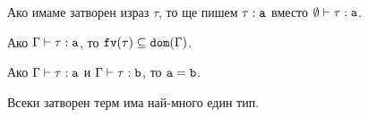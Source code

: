 \begin{prooftree}
\end{prooftree}

\begin{prooftree}
\end{prooftree}

Ако имаме затворен израз $\tau$, то ще пишем $\tau : \vv{a}$ вместо $\emptyset \vdash \tau : \vv{a}$.

\begin{proposition}
  Ако $\Gamma \vdash \tau : \vv{a}$, то $\fv(\tau) \subseteq \vv{dom}(\Gamma)$.
\end{proposition}

\begin{proposition}
  Ако $\Gamma \vdash \tau : \vv{a}$ и $\Gamma \vdash \tau : \vv{b}$, то $\vv{a} = \vv{b}$.
\end{proposition}

\begin{corollary}
  Всеки затворен терм има най-много един тип.
\end{corollary}

